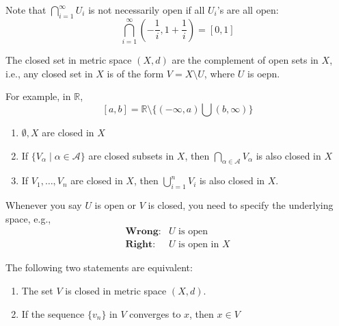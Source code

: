 \begin{remark}
Note that $\bigcap_{i=1}^\infty U_i$ is not necessarily open if all $U_i$'s are all open:
\[
\bigcap_{i=1}^\infty
\left(
-\frac{1}{i},1+\frac{1}{i}
\right)
=
[0,1]
\]
\end{remark}

\begin{definition}[Closed]
The closed set in metric space $(X,d)$ are the complement of open sets in $X$, i.e., any closed set in $X$ is of the form $V=X\setminus U$, where $U$ is oepn.
\end{definition}

For example, in $\mathbb{R}$, 
\[
[a,b]=\mathbb{R}\setminus\{(-\infty,a)\bigcup(b,\infty)\}
\]

\begin{proposition}
\begin{enumerate}
\item
$\emptyset,X$ are closed in $X$
\item
If
$\{V_\alpha\mid\alpha\in\mathcal{A}\}$ are closed subsets in $X$, then $\bigcap_{\alpha\in\mathcal{A}}V_\alpha$ is also closed in $X$
\item
If $V_1,\dots,V_n$ are closed in $X$, then $\bigcup_{i=1}^nV_i$ is also closed in $X$.
\end{enumerate}
\end{proposition}

\begin{remark}
Whenever you say $U$ is open or $V$ is closed, you need to specify the underlying space, e.g.,
\begin{align*}
\textbf{Wrong}: &\text{$U$ is open}\\
\textbf{Right}: &\text{$U$ is open in $X$}
\end{align*}
\end{remark}

\begin{proposition}
The following two statements are equivalent:
\begin{enumerate}
\item
The set $V$ is closed in metric space $(X,d)$.
\item
If the sequence $\{v_n\}$ in $V$ converges to $x$, then $x\in V$
\end{enumerate}
\end{proposition}


